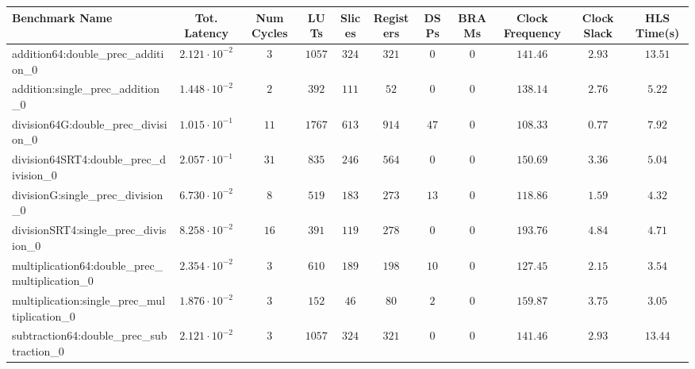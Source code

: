 \begin{tabular}{|l|c|c|c|c|c|c|c|c|c|c|}
\hline
Benchmark Name                                   & Tot. Latency            & Num Cycles & LUTs     & Slices   & Registers & DSPs   & BRAMs & Clock Frequency & Clock Slack & HLS Time(s) \\
\hline
addition64:double\_prec\_addition\_0             & $ 2.121 \cdot 10^{-2} $ & $ 3      $ & $ 1057 $ & $ 324  $ & $ 321   $ & $ 0  $ & $ 0 $ & $ 141.46      $ & $ 2.93    $ & $ 13.51   $ \\
addition:single\_prec\_addition\_0               & $ 1.448 \cdot 10^{-2} $ & $ 2      $ & $ 392  $ & $ 111  $ & $ 52    $ & $ 0  $ & $ 0 $ & $ 138.14      $ & $ 2.76    $ & $ 5.22    $ \\
division64G:double\_prec\_division\_0            & $ 1.015 \cdot 10^{-1} $ & $ 11     $ & $ 1767 $ & $ 613  $ & $ 914   $ & $ 47 $ & $ 0 $ & $ 108.33      $ & $ 0.77    $ & $ 7.92    $ \\
division64SRT4:double\_prec\_division\_0         & $ 2.057 \cdot 10^{-1} $ & $ 31     $ & $ 835  $ & $ 246  $ & $ 564   $ & $ 0  $ & $ 0 $ & $ 150.69      $ & $ 3.36    $ & $ 5.04    $ \\
divisionG:single\_prec\_division\_0              & $ 6.730 \cdot 10^{-2} $ & $ 8      $ & $ 519  $ & $ 183  $ & $ 273   $ & $ 13 $ & $ 0 $ & $ 118.86      $ & $ 1.59    $ & $ 4.32    $ \\
divisionSRT4:single\_prec\_division\_0           & $ 8.258 \cdot 10^{-2} $ & $ 16     $ & $ 391  $ & $ 119  $ & $ 278   $ & $ 0  $ & $ 0 $ & $ 193.76      $ & $ 4.84    $ & $ 4.71    $ \\
multiplication64:double\_prec\_multiplication\_0 & $ 2.354 \cdot 10^{-2} $ & $ 3      $ & $ 610  $ & $ 189  $ & $ 198   $ & $ 10 $ & $ 0 $ & $ 127.45      $ & $ 2.15    $ & $ 3.54    $ \\
multiplication:single\_prec\_multiplication\_0   & $ 1.876 \cdot 10^{-2} $ & $ 3      $ & $ 152  $ & $ 46   $ & $ 80    $ & $ 2  $ & $ 0 $ & $ 159.87      $ & $ 3.75    $ & $ 3.05    $ \\
subtraction64:double\_prec\_subtraction\_0       & $ 2.121 \cdot 10^{-2} $ & $ 3      $ & $ 1057 $ & $ 324  $ & $ 321   $ & $ 0  $ & $ 0 $ & $ 141.46      $ & $ 2.93    $ & $ 13.44   $ \\

\end{tabular}
